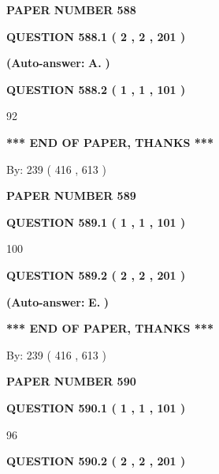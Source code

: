 \documentclass[12pt]{article}
\begin{document}
   
\newpage 
\setcounter{page}{ 
   588001 } 
   
   
 {\textbf{ \Large{ PAPER NUMBER  588  }}}
   
   
   
   
  
  
{\textbf{\large{QUESTION
588.1 
 ( 2 , 2 , 201 )
}}}
 
 
{\textbf{(Auto-answer:}}
{\textbf{\large{
A.}}}
{\textbf{)}}
 
 
  
  
{\textbf{\large{QUESTION
588.2 
 ( 1 , 1 , 101 )
}}}

92
   
   
   
   
\vspace{1.0in} 
{\textbf{\large{ *** END OF PAPER, THANKS *** }}} 
   
   
\hspace{1.0in} By: 
 239 ( 416 ,  613 )
   
   
   
   
\newpage 
\setcounter{page}{ 
   589001 } 
   
   
 {\textbf{ \Large{ PAPER NUMBER  589  }}}
   
   
   
   
  
  
{\textbf{\large{QUESTION
589.1 
 ( 1 , 1 , 101 )
}}}

100
  
  
{\textbf{\large{QUESTION
589.2 
 ( 2 , 2 , 201 )
}}}
 
 
{\textbf{(Auto-answer:}}
{\textbf{\large{
E.}}}
{\textbf{)}}
 
 
   
   
   
   
\vspace{1.0in} 
{\textbf{\large{ *** END OF PAPER, THANKS *** }}} 
   
   
\hspace{1.0in} By: 
 239 ( 416 ,  613 )
   
   
   
   
\newpage 
\setcounter{page}{ 
   590001 } 
   
   
 {\textbf{ \Large{ PAPER NUMBER  590  }}}
   
   
   
   
  
  
{\textbf{\large{QUESTION
590.1 
 ( 1 , 1 , 101 )
}}}

96
  
  
{\textbf{\large{QUESTION
590.2 
 ( 2 , 2 , 201 )
}}}
 
\end{document}
